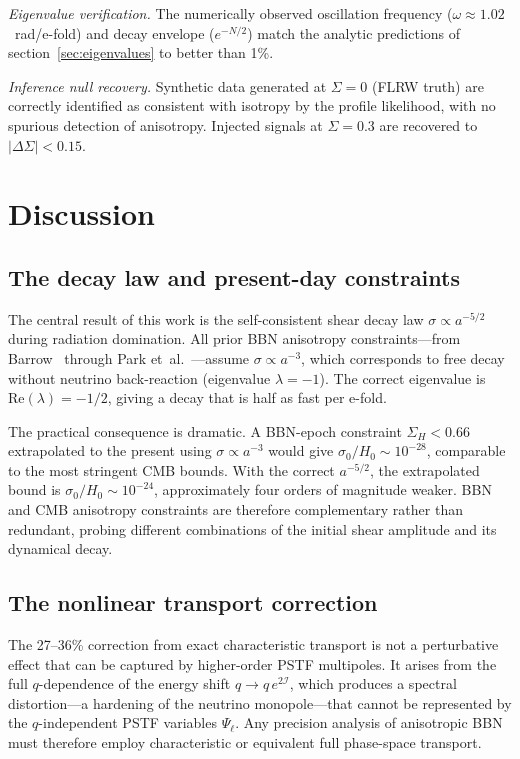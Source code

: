 \documentclass[a4paper,11pt]{article}
\newcommand{\Sig}{\Sigma}
\newcommand{\SigH}{\Sigma_H}
\begin{document}
\textit{Eigenvalue verification.}  The numerically observed oscillation frequency ($\omega \approx 1.02$~rad/e-fold) and decay envelope ($e^{-N/2}$) match the analytic predictions of section~\ref{sec:eigenvalues} to better than 1\%.

\textit{Inference null recovery.}  Synthetic data generated at $\Sig = 0$ (FLRW truth) are correctly identified as consistent with isotropy by the profile likelihood, with no spurious detection of anisotropy.  Injected signals at $\Sig = 0.3$ are recovered to $|\Delta\Sig| < 0.15$.


\section{Discussion}\label{sec:discussion}

\subsection{The decay law and present-day constraints}

The central result of this work is the self-consistent shear decay law $\sigma \propto a^{-5/2}$ during radiation domination.  All prior BBN anisotropy constraints---from Barrow~\cite{Barrow1976} through Park et~al.~\cite{Park2025}---assume $\sigma \propto a^{-3}$, which corresponds to free decay without neutrino back-reaction (eigenvalue $\lambda = -1$).  The correct eigenvalue is $\mathrm{Re}(\lambda) = -1/2$, giving a decay that is half as fast per e-fold.

The practical consequence is dramatic.  A BBN-epoch constraint $\SigH < 0.66$ extrapolated to the present using $\sigma \propto a^{-3}$ would give $\sigma_0/H_0 \sim 10^{-28}$, comparable to the most stringent CMB bounds.  With the correct $a^{-5/2}$, the extrapolated bound is $\sigma_0/H_0 \sim 10^{-24}$, approximately four orders of magnitude weaker.  BBN and CMB anisotropy constraints are therefore complementary rather than redundant, probing different combinations of the initial shear amplitude and its dynamical decay.

\subsection{The nonlinear transport correction}

The 27--36\% correction from exact characteristic transport is not a perturbative effect that can be captured by higher-order PSTF multipoles.  It arises from the full $q$-dependence of the energy shift $q \to q\,e^{2\mathcal{I}}$, which produces a spectral distortion---a hardening of the neutrino monopole---that cannot be represented by the $q$-independent PSTF variables $\Psi_\ell$.  Any precision analysis of anisotropic BBN must therefore employ characteristic or equivalent full phase-space transport.
\end{document}
